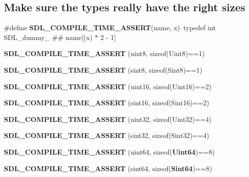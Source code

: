 \subsection*{Make sure the types really have the right sizes}
\begin{DoxyCompactItemize}
\item 
\#define {\bfseries S\+D\+L\+\_\+\+C\+O\+M\+P\+I\+L\+E\+\_\+\+T\+I\+M\+E\+\_\+\+A\+S\+S\+E\+R\+T}(name,  x)~typedef int S\+D\+L\+\_\+dummy\+\_\+ \#\# name[(x) $\ast$ 2 -\/ 1]\label{_s_d_l__stdinc_8h_aba1f23ae531b67b0455a2e254bdad09b}

\item 
{\bfseries S\+D\+L\+\_\+\+C\+O\+M\+P\+I\+L\+E\+\_\+\+T\+I\+M\+E\+\_\+\+A\+S\+S\+E\+R\+T} (uint8, sizeof(Uint8)==1)\label{_s_d_l__stdinc_8h_a005ad2de7d2d27e7f899981151b751ae}

\item 
{\bfseries S\+D\+L\+\_\+\+C\+O\+M\+P\+I\+L\+E\+\_\+\+T\+I\+M\+E\+\_\+\+A\+S\+S\+E\+R\+T} (sint8, sizeof(Sint8)==1)\label{_s_d_l__stdinc_8h_a9a884db976fc89f11817a665ba766cc7}

\item 
{\bfseries S\+D\+L\+\_\+\+C\+O\+M\+P\+I\+L\+E\+\_\+\+T\+I\+M\+E\+\_\+\+A\+S\+S\+E\+R\+T} (uint16, sizeof(Uint16)==2)\label{_s_d_l__stdinc_8h_aa9d7e4271804d40d44b355efd1cb20be}

\item 
{\bfseries S\+D\+L\+\_\+\+C\+O\+M\+P\+I\+L\+E\+\_\+\+T\+I\+M\+E\+\_\+\+A\+S\+S\+E\+R\+T} (sint16, sizeof(Sint16)==2)\label{_s_d_l__stdinc_8h_a77b37f1b37ecaacc3de9c4c151f95c2a}

\item 
{\bfseries S\+D\+L\+\_\+\+C\+O\+M\+P\+I\+L\+E\+\_\+\+T\+I\+M\+E\+\_\+\+A\+S\+S\+E\+R\+T} (uint32, sizeof(Uint32)==4)\label{_s_d_l__stdinc_8h_ac3b0ba0791e90561c88d298c6d2df7b3}

\item 
{\bfseries S\+D\+L\+\_\+\+C\+O\+M\+P\+I\+L\+E\+\_\+\+T\+I\+M\+E\+\_\+\+A\+S\+S\+E\+R\+T} (sint32, sizeof(Sint32)==4)\label{_s_d_l__stdinc_8h_a1146d5974e28b88fff618b4ba91b4256}

\item 
{\bfseries S\+D\+L\+\_\+\+C\+O\+M\+P\+I\+L\+E\+\_\+\+T\+I\+M\+E\+\_\+\+A\+S\+S\+E\+R\+T} (uint64, sizeof({\bf Uint64})==8)\label{_s_d_l__stdinc_8h_a0cbe41d1cdf13b649c880b998631a866}

\item 
{\bfseries S\+D\+L\+\_\+\+C\+O\+M\+P\+I\+L\+E\+\_\+\+T\+I\+M\+E\+\_\+\+A\+S\+S\+E\+R\+T} (sint64, sizeof({\bf Sint64})==8)\label{_s_d_l__stdinc_8h_a60b667298d32de56e9c81c944970cace}

\end{DoxyCompactItemize}
